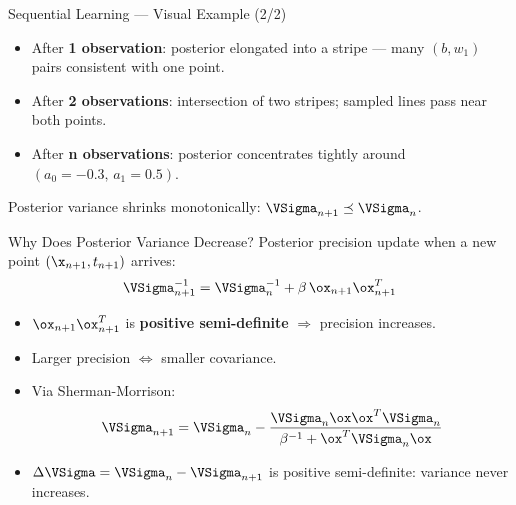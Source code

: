 \begin{frame}{Sequential Learning — Visual Example (2/2)}
  \begin{itemize}
    \item After \textbf{1 observation}: posterior elongated into a stripe — many $(b,w_1)$ pairs consistent with one point.
    \item After \textbf{2 observations}: intersection of two stripes; sampled lines pass near both points.
    \item After \textbf{n observations}: posterior concentrates tightly around $(a_0{=}-0.3,\,a_1{=}0.5)$.
  \end{itemize}
  \vspace{.3em}
  \begin{center}
  \end{center}
  Posterior variance shrinks monotonically: $\VSigma_{n+1}\preceq\VSigma_n$.
\end{frame}

\begin{frame}{Why Does Posterior Variance Decrease?}
  Posterior precision update when a new point $(\x_{n+1},t_{n+1})$ arrives:
  \[
    \VSigma_{n+1}^{-1} = \VSigma_n^{-1} + \beta\,\ox_{n+1}\ox_{n+1}^T
  \]
  \begin{itemize}
    \item $\ox_{n+1}\ox_{n+1}^T$ is \textbf{positive semi-definite} $\Rightarrow$ precision increases.
    \item Larger precision $\Leftrightarrow$ smaller covariance.
    \item Via Sherman-Morrison:
    \[
      \VSigma_{n+1} = \VSigma_n - \frac{\VSigma_n\ox\ox^T\VSigma_n}{\beta^{-1}+\ox^T\VSigma_n\ox}
    \]
    \item $\Delta\VSigma = \VSigma_n - \VSigma_{n+1}$ is positive semi-definite: \alert{variance never increases}.
  \end{itemize}
\end{frame}

